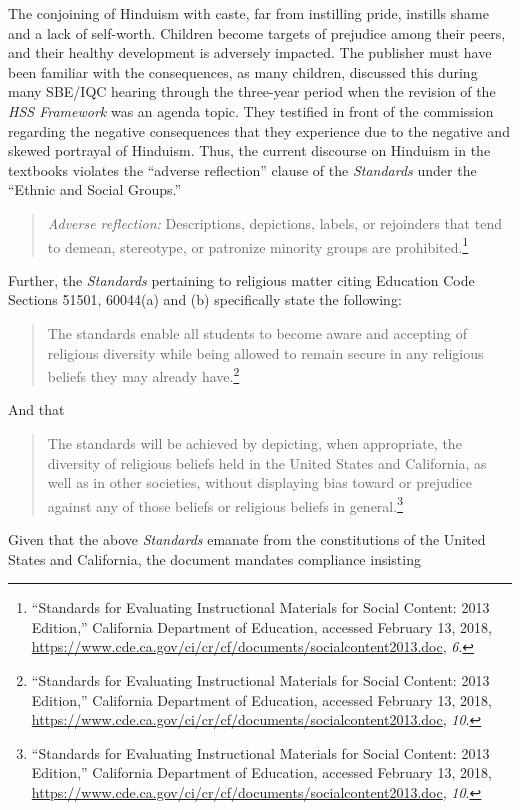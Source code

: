 The conjoining of Hinduism with caste, far from instilling pride, instills shame and a lack of self-worth. Children become targets of prejudice among their peers, and their healthy development is adversely impacted. The publisher must have been familiar with the consequences, as many children, discussed this during many SBE/IQC hearing through the three-year period when the revision of the \textit{HSS Framework} was an agenda topic. They testified in front of the commission regarding the negative consequences that they experience due to the negative and skewed portrayal of Hinduism. Thus, the current discourse on Hinduism in the textbooks violates the “adverse reflection” clause of the \textit{Standards} under the “Ethnic and Social Groups.”
\begin{quote}
\textit{Adverse reflection:} Descriptions, depictions, labels, or rejoinders that tend to demean, stereotype, or patronize minority groups are prohibited.\footnote{“Standards for Evaluating Instructional Materials for Social Content: 2013 Edition,” California Department of Education, accessed February 13, 2018, \url{https://www.cde.ca.gov/ci/cr/cf/documents/socialcontent2013.doc}, \textit{6}.}
\end{quote}
Further, the \textit{Standards} pertaining to religious matter citing Education Code Sections 51501, 60044(a) and (b) specifically state the following:
\begin{quote}
The standards enable all students to become aware and accepting of religious diversity while being allowed to remain secure in any religious beliefs they may already have.\footnote{“Standards for Evaluating Instructional Materials for Social Content: 2013 Edition,” California Department of Education, accessed February 13, 2018, \url{https://www.cde.ca.gov/ci/cr/cf/documents/socialcontent2013.doc}, \textit{10}.}
\end{quote}
And that
\begin{quote}
The standards will be achieved by depicting, when appropriate, the diversity of religious beliefs held in the United States and California, as well as in other societies, without displaying bias toward or prejudice against any of those beliefs or religious beliefs in general.\footnote{“Standards for Evaluating Instructional Materials for Social Content: 2013 Edition,” California Department of Education, accessed February 13, 2018, \url{https://www.cde.ca.gov/ci/cr/cf/documents/socialcontent2013.doc}, \textit{10}.}
\end{quote}
Given that the above \textit{Standards} emanate from the constitutions of the United States and California, the document mandates compliance insisting
